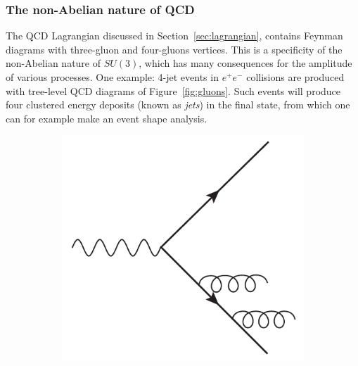 \subsubsection{The non-Abelian nature of QCD}

The QCD Lagrangian discussed in Section~\ref{sec:lagrangian}, contains Feynman
diagrams with three-gluon and
four-gluons vertices. This is a specificity of the non-Abelian nature
of $SU(3)$, which has many consequences for the amplitude of various
processes. One example: 4-jet events in $e^{+}e^{-}$  collisions are
produced with tree-level QCD diagrams of Figure~\ref{fig:gluons}. Such
events will produce four clustered energy deposits (known as
\textit{jets}) in the final state, from which one can for example make
an event shape analysis.
\begin{figure}
\begin{center}
    \begin{subfigure}{0.244\textwidth}
      \includegraphics[width=\textwidth]{Chapters/pQCD/gluon1.pdf}\caption{}\end{subfigure}
    \begin{subfigure}{0.244\textwidth}

\end{subfigure}
\end{center}
\end{figure}
